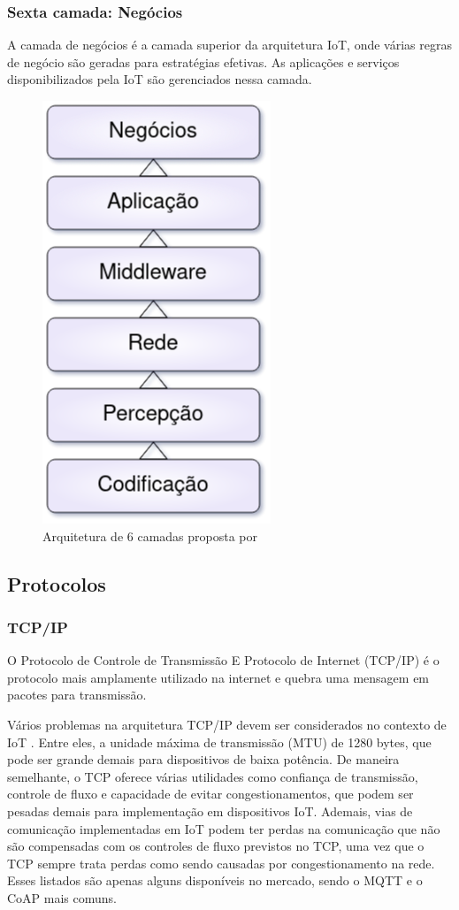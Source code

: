 \documentclass[tcc,capa]{texufpel}
\begin{document}
\subsubsection{Sexta camada: Negócios}
    A camada de negócios é a camada superior da arquitetura IoT, onde várias regras de negócio são geradas para estratégias efetivas. As aplicações e serviços disponibilizados pela IoT são gerenciados nessa camada.

\begin{figure}[h]
    \centering
    \includegraphics[scale=0.5]{figs/xu.png}
    \caption{Arquitetura de 6 camadas proposta por \citet{xu}}
    \label{fig:6layer}
\end{figure}



\subsection{Protocolos}

\subsubsection{TCP/IP}
O Protocolo de Controle de Transmissão E Protocolo de Internet (TCP/IP) é o protocolo mais amplamente utilizado na internet e quebra uma mensagem em pacotes para transmissão.

Vários problemas na arquitetura TCP/IP devem ser considerados no contexto de IoT \cite{schiller}. Entre eles, a unidade máxima de transmissão (MTU) de 1280 bytes, que pode ser grande demais para dispositivos de baixa potência. De maneira semelhante, o TCP oferece várias utilidades como confiança de transmissão, controle de fluxo e capacidade de evitar congestionamentos, que podem ser pesadas demais para implementação em dispositivos IoT. Ademais, vias de comunicação implementadas em IoT podem ter perdas na comunicação que não são compensadas com os controles de fluxo previstos no TCP, uma vez que o TCP sempre trata perdas como sendo causadas por congestionamento na rede. Esses listados são apenas alguns disponíveis no mercado, sendo o MQTT e o CoAP mais comuns.
\end{document}
